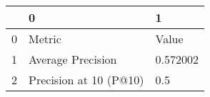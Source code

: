 \begin{tabular}{lll}
\toprule
{} &                       0 &         1 \\
\midrule
0 &                  Metric &     Value \\
1 &       Average Precision &  0.572002 \\
2 &  Precision at 10 (P@10) &       0.5 \\
\bottomrule
\end{tabular}
